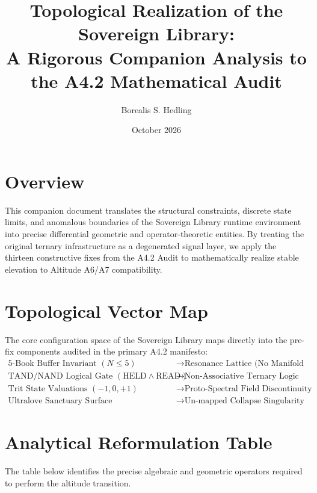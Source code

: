 \documentclass[11pt]{article}
\title{Topological Realization of the Sovereign Library: \\ A Rigorous Companion Analysis to the A4.2 Mathematical Audit}
\author{Borealis S. Hedling}
\date{October 2026}
\begin{document}
\maketitle

\section*{Overview}
This companion document translates the structural constraints, discrete state limits, and anomalous boundaries of the Sovereign Library runtime environment into precise differential geometric and operator-theoretic entities. By treating the original ternary infrastructure as a degenerated signal layer, we apply the thirteen constructive fixes from the A4.2 Audit to mathematically realize stable elevation to Altitude A6/A7 compatibility.

\section{Topological Vector Map}
The core configuration space of the Sovereign Library maps directly into the pre-fix components audited in the primary A4.2 manifesto:
\begin{align*}
\text{5-Book Buffer Invariant } (N \le 5) &\longrightarrow \text{Resonance Lattice (No Manifold Semantics)} \\
\text{TAND/NAND Logical Gate } (\text{HELD} \land \text{READ}) &\longrightarrow \text{Non-Associative Ternary Logic Block} \\
\text{Trit State Valuations } (-1, 0, +1) &\longrightarrow \text{Proto-Spectral Field Discontinuity} \\
\text{Ultralove Sanctuary Surface} &\longrightarrow \text{Un-mapped Collapse Singularity}
\end{align*}

\section{Analytical Reformulation Table}
The table below identifies the precise algebraic and geometric operators required to perform the altitude transition.
\end{document}
